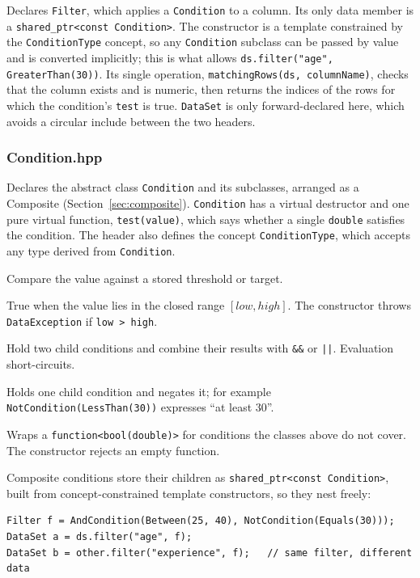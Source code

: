 \documentclass[11pt,a4paper]{article}
\newcommand{\code}[1]{\texttt{#1}}
\begin{document}
Declares \code{Filter}, which applies a \code{Condition} to a column. Its only data member is a
\code{shared\_ptr<const Condition>}. The constructor is a template constrained by the
\code{ConditionType} concept, so any \code{Condition} subclass can be passed by value and is
converted implicitly; this is what allows \code{ds.filter("age", GreaterThan(30))}. Its single
operation, \code{matchingRows(ds, columnName)}, checks that the column exists and is numeric, then
returns the indices of the rows for which the condition's \code{test} is true. \code{DataSet} is
only forward-declared here, which avoids a circular include between the two headers.

\subsubsection*{Condition.hpp}

Declares the abstract class \code{Condition} and its subclasses, arranged as a Composite
(Section~\ref{sec:composite}). \code{Condition} has a virtual destructor and one pure virtual
function, \code{test(value)}, which says whether a single \code{double} satisfies the condition.
The header also defines the concept \code{ConditionType}, which accepts any type derived from
\code{Condition}.

\begin{description}[noitemsep,leftmargin=1.5em]
  \item[\code{GreaterThan}, \code{LessThan}, \code{Equals}] Compare the value against a stored
    threshold or target.
  \item[\code{Between}] True when the value lies in the closed range $[\mathit{low}, \mathit{high}]$.
    The constructor throws \code{DataException} if \code{low > high}.
  \item[\code{AndCondition}, \code{OrCondition}] Hold two child conditions and combine their
    results with \code{\&\&} or \code{||}. Evaluation short-circuits.
  \item[\code{NotCondition}] Holds one child condition and negates it; for example
    \code{NotCondition(LessThan(30))} expresses ``at least 30''.
  \item[\code{Predicate}] Wraps a \code{function<bool(double)>} for conditions the classes above do
    not cover. The constructor rejects an empty function.
\end{description}

Composite conditions store their children as \code{shared\_ptr<const Condition>}, built from
concept-constrained template constructors, so they nest freely:
\begin{lstlisting}
Filter f = AndCondition(Between(25, 40), NotCondition(Equals(30)));
DataSet a = ds.filter("age", f);
DataSet b = other.filter("experience", f);   // same filter, different data
\end{lstlisting}
\end{document}
